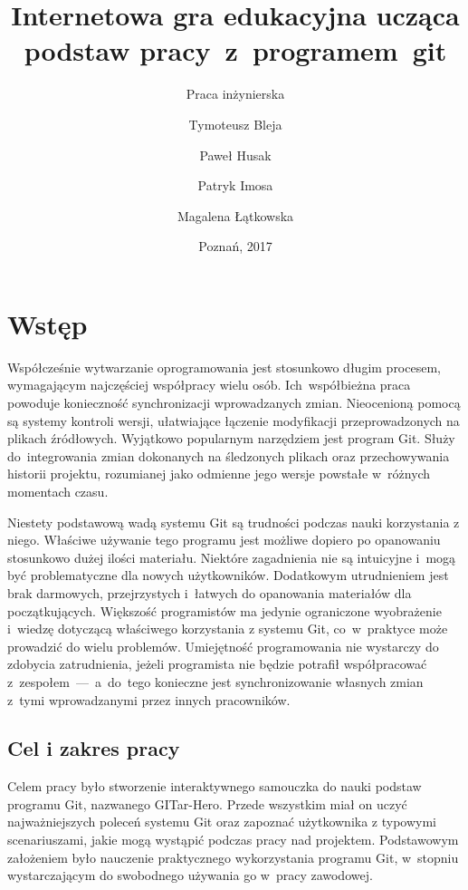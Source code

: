 \documentclass[12pt,a4paper,polish,thesis]{dcsbook}
\begin{document}
	\author{Tymoteusz Bleja \and Paweł Husak \and Patryk Imosa \and Magalena Łątkowska}
	\title{Internetowa gra edukacyjna ucząca podstaw pracy~z~programem~git}
	\subtitle{Praca inżynierska}
	\date{Poznań, 2017}
	\maketitle
	\frontmatter
	\tableofcontents{}
	\mainmatter

	\chapter{Wstęp}
	
	Współcześnie wytwarzanie oprogramowania jest stosunkowo długim procesem, wymagającym najczęściej współpracy wielu osób. Ich~współbieżna praca powoduje konieczność synchronizacji wprowadzanych zmian. Nieocenioną pomocą są systemy kontroli wersji, ułatwiające łączenie modyfikacji przeprowadzonych na plikach źródłowych. Wyjątkowo popularnym narzędziem jest program Git. Służy do~integrowania zmian dokonanych na śledzonych plikach oraz przechowywania historii projektu, rozumianej jako odmienne jego wersje powstałe w~różnych momentach czasu.

	Niestety podstawową wadą systemu Git są trudności podczas nauki korzystania z niego. Właściwe używanie tego programu jest możliwe dopiero po opanowaniu stosunkowo dużej ilości materiału. Niektóre zagadnienia nie są intuicyjne i~mogą być problematyczne dla nowych użytkowników. Dodatkowym utrudnieniem jest brak darmowych, przejrzystych i~łatwych do opanowania materiałów dla początkujących. Większość programistów ma jedynie ograniczone wyobrażenie i~wiedzę dotyczącą właściwego korzystania z systemu Git, co~w~praktyce może prowadzić do wielu problemów. Umiejętność programowania nie wystarczy do zdobycia zatrudnienia, jeżeli programista nie będzie potrafił współpracować z~zespołem~---~a~do~tego konieczne jest synchronizowanie własnych zmian z~tymi wprowadzanymi przez innych pracowników. 

	\section*{Cel i zakres pracy}

	Celem pracy było stworzenie interaktywnego samouczka do nauki podstaw programu Git, nazwanego GITar-Hero. Przede wszystkim miał on uczyć najważniejszych poleceń systemu Git oraz zapoznać użytkownika z typowymi scenariuszami, jakie mogą wystąpić podczas pracy nad projektem. Podstawowym założeniem było nauczenie praktycznego wykorzystania programu Git, w~stopniu wystarczającym do swobodnego używania go w~pracy zawodowej.
	
\end{document}
